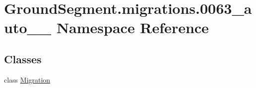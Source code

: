 \hypertarget{namespace_ground_segment_1_1migrations_1_10063__auto__20170601__1929}{}\section{Ground\+Segment.\+migrations.0063\+\_\+auto\+\_\+\_ Namespace Reference}
\label{namespace_ground_segment_1_1migrations_1_10063__auto__20170601__1929}
\subsection*{Classes}
\begin{DoxyCompactItemize}
\item 
class \hyperlink{class_ground_segment_1_1migrations_1_10063__auto__20170601__1929_1_1_migration}{Migration}
\end{DoxyCompactItemize}
